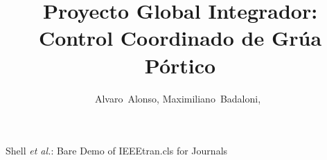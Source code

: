 \documentclass[journal]{IEEEtran}
\begin{document}
%
\title{Proyecto Global Integrador:\\
Control Coordinado de Grúa Pórtico}
%
%
%

\author{Alvaro~Alonso,
        Maximiliano~Badaloni,~%
}

% 
%



%
{Shell \MakeLowercase{\textit{et al.}}: Bare Demo of IEEEtran.cls for Journals}
% 
\end{document}
